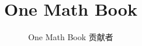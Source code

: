 \documentclass[11pt,a4paper,twoside,openany]{book}
\title{One Math Book}
\author{One Math Book 贡献者}
\date{\bookdate}
\begin{document}
\frontmatter



\tableofcontents

\mainmatter





\appendix
\part{\omsolutionspart}




\backmatter
\printindex
\end{document}
